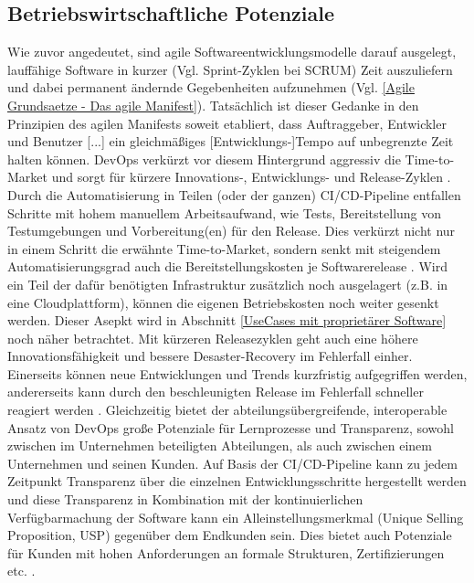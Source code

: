 \subsection{Betriebswirtschaftliche Potenziale}
\label{Betriebswirtschaftliche Potenziale}
Wie zuvor angedeutet, sind agile Softwareentwicklungsmodelle darauf ausgelegt, lauffähige Software in kurzer (Vgl. Sprint-Zyklen bei \gls{SCRUM}) Zeit auszuliefern und dabei permanent ändernde Gegebenheiten aufzunehmen (Vgl. \ref{Agile Grundsaetze - Das agile Manifest}). Tatsächlich ist dieser Gedanke in den Prinzipien des agilen Manifests soweit etabliert, dass \glqq Auftraggeber, Entwickler und Benutzer [...] ein gleichmäßiges [Entwicklungs-]Tempo auf unbegrenzte Zeit halten können\grqq{}\cite{beck_prinzipien_2001}.\newline
\gls{DevOps} verkürzt vor diesem Hintergrund aggressiv die \gls{Time-to-Market} und sorgt für kürzere Innovations-, Entwicklungs- und Release-Zyklen \cite{forsgren_devops_2015}. Durch die Automatisierung in Teilen (oder der ganzen) \acrshort{CI}/\acrshort{CD}-Pipeline entfallen Schritte mit hohem manuellem Arbeitsaufwand, wie Tests, Bereitstellung von Testumgebungen und Vorbereitung(en) für den Release. Dies verkürzt nicht nur in einem Schritt die erwähnte \gls{Time-to-Market}, sondern senkt mit steigendem Automatisierungsgrad auch die Bereitstellungskosten je Softwarerelease \cite{forsgren_devops_2015}.
Wird ein Teil der dafür benötigten Infrastruktur zusätzlich noch ausgelagert (z.B. in eine Cloudplattform), können die eigenen Betriebskosten noch weiter gesenkt werden. Dieser Asepkt wird in Abschnitt \ref{UseCases mit proprietärer Software} noch näher betrachtet.\newline
Mit kürzeren Releasezyklen geht auch eine höhere Innovationsfähigkeit und bessere Desaster-Recovery im Fehlerfall einher. Einerseits können neue Entwicklungen und Trends kurzfristig aufgegriffen werden, andererseits kann durch den beschleunigten Release im Fehlerfall schneller reagiert werden \cite{forsgren_devops_2015}.
Gleichzeitig bietet der abteilungsübergreifende, interoperable Ansatz von \gls{DevOps} große Potenziale für Lernprozesse und Transparenz, sowohl zwischen im Unternehmen beteiligten Abteilungen, als auch zwischen einem Unternehmen und seinen Kunden.
Auf Basis der \acrshort{CI}/\acrshort{CD}-Pipeline kann zu jedem Zeitpunkt Transparenz über die einzelnen Entwicklungsschritte hergestellt werden und diese Transparenz in Kombination mit der kontinuierlichen Verfügbarmachung der Software kann ein Alleinstellungsmerkmal (Unique Selling Proposition, \acrshort{USP}) gegenüber dem Endkunden sein. Dies bietet auch Potenziale für Kunden mit hohen Anforderungen an formale Strukturen, Zertifizierungen etc. \cite[Kap. 7.2]{leite_survey_2020}.